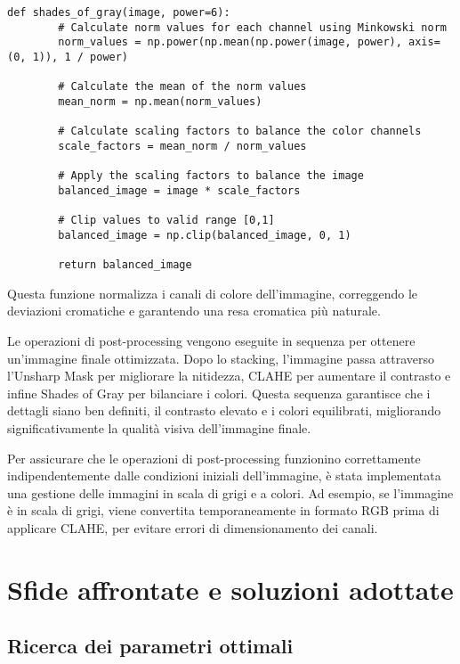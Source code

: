 \begin{lstlisting}[label={lst:color_balance}]
    def shades_of_gray(image, power=6):
        # Calculate norm values for each channel using Minkowski norm
        norm_values = np.power(np.mean(np.power(image, power), axis=(0, 1)), 1 / power)
        
        # Calculate the mean of the norm values
        mean_norm = np.mean(norm_values)
        
        # Calculate scaling factors to balance the color channels
        scale_factors = mean_norm / norm_values
        
        # Apply the scaling factors to balance the image
        balanced_image = image * scale_factors
        
        # Clip values to valid range [0,1]
        balanced_image = np.clip(balanced_image, 0, 1)

        return balanced_image 
\end{lstlisting}

Questa funzione normalizza i canali di colore dell'immagine, correggendo le deviazioni cromatiche e garantendo una resa cromatica più naturale.

Le operazioni di post-processing vengono eseguite in sequenza per ottenere un'immagine finale ottimizzata. Dopo lo stacking, l'immagine passa attraverso l'Unsharp Mask per migliorare la nitidezza, CLAHE per aumentare il contrasto e infine Shades of Gray per bilanciare i colori. Questa sequenza garantisce che i dettagli siano ben definiti, il contrasto elevato e i colori equilibrati, migliorando significativamente la qualità visiva dell'immagine finale.

Per assicurare che le operazioni di post-processing funzionino correttamente indipendentemente dalle condizioni iniziali dell'immagine, è stata implementata una gestione delle immagini in scala di grigi e a colori. Ad esempio, se l'immagine è in scala di grigi, viene convertita temporaneamente in formato RGB prima di applicare CLAHE, per evitare errori di dimensionamento dei canali.

\section{Sfide affrontate e soluzioni adottate} \label{sec:challenges}

\subsection{Ricerca dei parametri ottimali}

